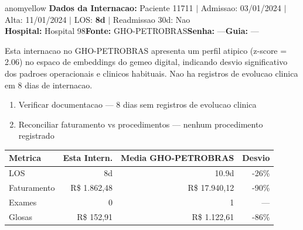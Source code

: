 \documentclass[a4paper,10pt]{article}
\begin{document}
\begin{anomalycard}[Internacao 76405 | GHO-PETROBRAS | MODERADO (z=2.06)]{anomyellow}
\textbf{Dados da Internacao:} Paciente 11711 $\mid$ Admissao: 03/01/2024 $\mid$ Alta: 11/01/2024 $\mid$ LOS: \textbf{8d} $\mid$ Readmissao 30d: Nao\\
\textbf{Hospital:} Hospital 98\quad\textbf{Fonte:} GHO-PETROBRAS\quad\textbf{Senha:} ---\quad\textbf{Guia:} ---\\
\vspace{2pt}\begin{tcolorbox}[colback=severityred!20,colframe=anomyellow,title={\textbf{Interpretacao de Negocio}},fonttitle=\bfseries\small,left=4pt,right=4pt,top=3pt,bottom=3pt]
{\small Esta internacao no GHO-PETROBRAS apresenta um perfil atipico (z-score = 2.06) no espaco de embeddings do gemeo digital, indicando desvio significativo dos padroes operacionais e clinicos habituais. Nao ha registros de evolucao clinica em 8 dias de internacao.}
\end{tcolorbox}
\begin{tcolorbox}[colback=severityyellow!30,colframe=anomorange,title={\textbf{Recomendacoes Especificas}},fonttitle=\bfseries\small,left=4pt,right=4pt,top=3pt,bottom=3pt]
\begin{enumerate}[nosep,leftmargin=16pt]
\item {\small Verificar documentacao --- 8 dias sem registros de evolucao clinica}
\item {\small Reconciliar faturamento vs procedimentos --- nenhum procedimento registrado}
\end{enumerate}
\end{tcolorbox}
\begin{center}\begin{tabular}{l r r r}\toprule\textbf{Metrica} & \textbf{Esta Intern.} & \textbf{Media GHO-PETROBRAS} & \textbf{Desvio} \\\midrule
LOS & 8d & 10.9d & -26\% \\
Faturamento & R\$ 1.862,48 & R\$ 17.940,12 & -90\% \\
Exames & 0 & 1 & --- \\
Glosas & R\$ 152,91 & R\$ 1.122,61 & -86\% \\
\bottomrule\end{tabular}\end{center}


\end{anomalycard}
\end{document}
